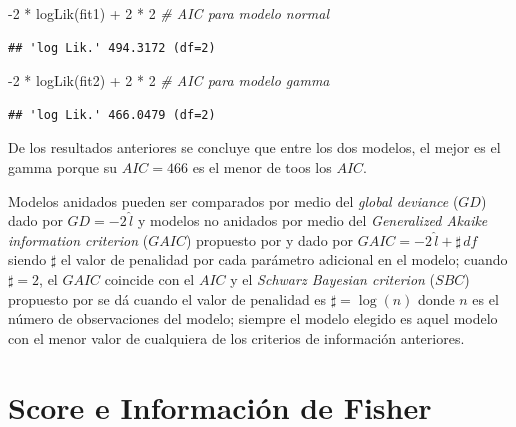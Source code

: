 \documentclass[
]{book}
\makeatletter
\newenvironment{Shaded}{\begin{snugshade}}{\end{snugshade}}
\newcommand{\CommentTok}[1]{\textcolor[rgb]{0.56,0.35,0.01}{\textit{#1}}}
\newcommand{\DecValTok}[1]{\textcolor[rgb]{0.00,0.00,0.81}{#1}}
\newcommand{\FunctionTok}[1]{\textcolor[rgb]{0.00,0.00,0.00}{#1}}
\newcommand{\NormalTok}[1]{#1}
\newcommand{\SpecialCharTok}[1]{\textcolor[rgb]{0.00,0.00,0.00}{#1}}
\newenvironment{kframe}{%
\medskip{}
\setlength{\fboxsep}{.8em}
 \def\at@end@of@kframe{}%
 \ifinner\ifhmode%
  \def\at@end@of@kframe{\end{minipage}}%
  \begin{minipage}{\columnwidth}%
 \fi\fi%
 \def\FrameCommand##1{\hskip\@totalleftmargin \hskip-\fboxsep
 \colorbox{shadecolor}{##1}\hskip-\fboxsep
     \hskip-\linewidth \hskip-\@totalleftmargin \hskip\columnwidth}%
 \MakeFramed {\advance\hsize-\width
   \@totalleftmargin\z@ \linewidth\hsize
   \@setminipage}}%
 {\par\unskip\endMakeFramed%
 \at@end@of@kframe}
\renewenvironment{Shaded}{\begin{kframe}}{\end{kframe}}
\newenvironment{rmdblock}[1]
  {
  \begin{itemize}
  \renewcommand{\labelitemi}{
    \raisebox{-.7\height}[0pt][0pt]{
      {\setkeys{Gin}{width=3em,keepaspectratio}\texttt{[image: images/\#1]}}
    }
  }
  \setlength{\fboxsep}{1em}
  \begin{kframe}
  \item
  }
  {
  \end{kframe}
  \end{itemize}
  }
\newenvironment{rmdnote}
  {\begin{rmdblock}{note}}
  {\end{rmdblock}}
\makeatother
\begin{document}
\begin{Shaded}
\begin{Highlighting}[]
\SpecialCharTok{{-}}\DecValTok{2} \SpecialCharTok{*} \FunctionTok{logLik}\NormalTok{(fit1) }\SpecialCharTok{+} \DecValTok{2} \SpecialCharTok{*} \DecValTok{2}  \CommentTok{\# AIC para modelo normal}
\end{Highlighting}
\end{Shaded}

\begin{verbatim}
## 'log Lik.' 494.3172 (df=2)
\end{verbatim}

\begin{Shaded}
\begin{Highlighting}[]
\SpecialCharTok{{-}}\DecValTok{2} \SpecialCharTok{*} \FunctionTok{logLik}\NormalTok{(fit2) }\SpecialCharTok{+} \DecValTok{2} \SpecialCharTok{*} \DecValTok{2}  \CommentTok{\# AIC para modelo gamma}
\end{Highlighting}
\end{Shaded}

\begin{verbatim}
## 'log Lik.' 466.0479 (df=2)
\end{verbatim}

De los resultados anteriores se concluye que entre los dos modelos, el mejor es el gamma porque su \(AIC=466\) es el menor de toos los \(AIC\).

\begin{rmdnote}
Modelos anidados pueden ser comparados por medio del \emph{global deviance} (\(GD\)) dado por \(GD=-2 \, \hat{l}\) y modelos no anidados por medio del \emph{Generalized Akaike information criterion} (\(GAIC\)) propuesto por \citet{Akaike83} y dado por \(GAIC=-2 \, \hat{l} + \sharp \, df\) siendo \(\sharp\) el valor de penalidad por cada parámetro adicional en el modelo; cuando \(\sharp = 2\), el \(GAIC\) coincide con el \(AIC\) y el \emph{Schwarz Bayesian criterion} (\(SBC\)) propuesto por \citet{Schwarz} se dá cuando el valor de penalidad es \(\sharp = \log(n)\) donde \(n\) es el número de observaciones del modelo; siempre el modelo elegido es aquel modelo con el menor valor de cualquiera de los criterios de información anteriores.
\end{rmdnote}

\hypertarget{score-e-informaciuxf3n-de-fisher}{%
\section{Score e Información de Fisher}\label{score-e-informaciuxf3n-de-fisher}}
\end{document}
